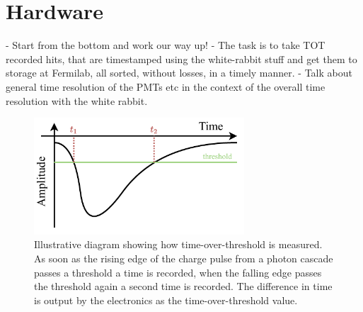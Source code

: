 \section{Hardware} %
\label{sec:daq_hard} %

- Start from the bottom and work our way up!
- The task is to take TOT recorded hits, that are timestamped using the white-rabbit stuff and get
them to storage at Fermilab, all sorted, without losses, in a timely manner.
- Talk about general time resolution of the PMTs etc in the context of the overall time resolution
with the white rabbit.

\begin{figure} %
    \includegraphics[width=0.7\textwidth]{diagrams/5-daq/tot.pdf}
    \caption[Illustrative diagram showing how time-over-threshold is measured.]
    {Illustrative diagram showing how time-over-threshold is measured. As soon as the rising edge
        of the charge pulse from a photon cascade passes a threshold a time is recorded, when the
        falling edge passes the threshold again a second time is recorded. The difference in time
        is output by the electronics as the time-over-threshold value.}
    \label{fig:tot}
\end{figure}

